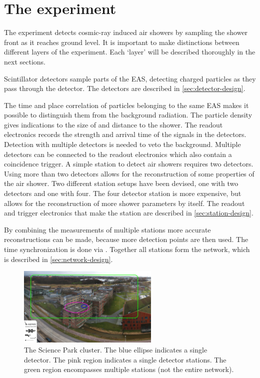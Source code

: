 \section{The \hisparc experiment}

The \hisparc experiment detects cosmic-ray induced air showers by sampling the shower front as it reaches ground level. It is important to make distinctions between different layers of the experiment. Each `layer' will be described thoroughly in the next sections.

Scintillator detectors sample parts of the EAS, detecting charged particles as they pass through the detector. The detectors are described in \cref{sec:detector-design}.

The time and place correlation of particles belonging to the same EAS makes it possible to distinguish them from the background radiation. The particle density gives indications to the size of and distance to the shower. The readout electronics records the strength and arrival time of the signals in the detectors. Detection with multiple detectors is needed to veto the background. Multiple detectors can be connected to the readout electronics which also contain a coincidence trigger. A simple station to detect air showers requires two detectors. Using more than two detectors allows for the reconstruction of some properties of the air shower. Two different station setups have been devised, one with two detectors and one with four. The four detector station is more expensive, but allows for the reconstruction of more shower parameters by itself. The readout and trigger electronics that make the station are described in \cref{sec:station-design}.

By combining the measurements of multiple stations more accurate reconstructions can be made, because more detection points are then used. The time synchronization is done via \gps. Together all stations form the \hisparc network, which is described in \cref{sec:network-design}.

\begin{figure}
    \centering
    \includegraphics[width=0.6\textwidth]
                    {plots/experiment/ADL_151373_151429_layers}
    \caption{The Science Park cluster. The blue ellipse indicates a single detector. The pink region indicates a single detector stations. The green region encompasses multiple stations (not the entire \hisparc network).}
    \label{fig:sciencepark-layers}
\end{figure}


